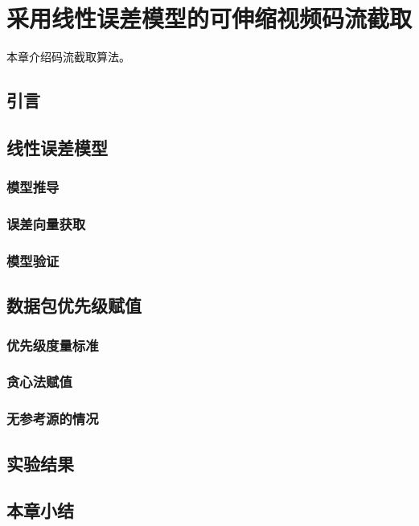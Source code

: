 \chapter{采用线性误差模型的可伸缩视频码流截取}
本章介绍码流截取算法。

\section{引言}

\section{线性误差模型}

\subsection{模型推导}

\subsection{误差向量获取}

\subsection{模型验证}

\section{数据包优先级赋值}

\subsection{优先级度量标准}

\subsection{贪心法赋值}

\subsection{无参考源的情况}

\section{实验结果}

\section{本章小结}